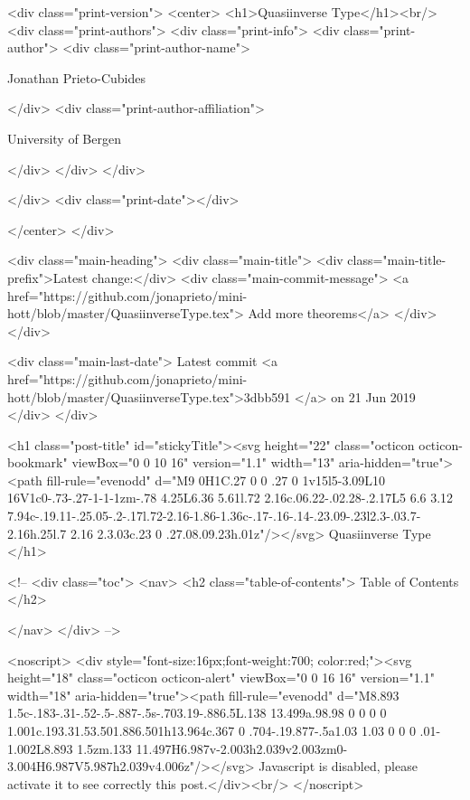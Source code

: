   <div class="print-version">
    <center>
      <h1>Quasiinverse Type</h1><br/>
        <div class="print-authors">
          <div class="print-info">
            <div class="print-author">
              <div class="print-author-name">
                
                  Jonathan Prieto-Cubides
                
              </div>
              <div class="print-author-affiliation">
                
                  University of Bergen
                
                </div>
            </div>
          </div>
          
          
        </div>
        <div class="print-date"></div>
        
        
    </center>
  </div>

  
  <div class="main-heading">
    <div class="main-title">
      <div class="main-title-prefix">Latest change:</div>
      <div class="main-commit-message">
            <a href="https://github.com/jonaprieto/mini-hott/blob/master/QuasiinverseType.tex">
              Add more theorems</a>
      </div>
    </div>

    <div class="main-last-date">
      Latest commit <a href="https://github.com/jonaprieto/mini-hott/blob/master/QuasiinverseType.tex">3dbb591 </a> on  21 Jun 2019
    </div>
  </div>
  
  <h1 class="post-title" id="stickyTitle"><svg height="22" class="octicon octicon-bookmark" viewBox="0 0 10 16" version="1.1" width="13" aria-hidden="true"><path fill-rule="evenodd" d="M9 0H1C.27 0 0 .27 0 1v15l5-3.09L10 16V1c0-.73-.27-1-1-1zm-.78 4.25L6.36 5.61l.72 2.16c.06.22-.02.28-.2.17L5 6.6 3.12 7.94c-.19.11-.25.05-.2-.17l.72-2.16-1.86-1.36c-.17-.16-.14-.23.09-.23l2.3-.03.7-2.16h.25l.7 2.16 2.3.03c.23 0 .27.08.09.23h.01z"/></svg> Quasiinverse Type
  </h1>

  <!-- 
  <div class="toc">
    <nav>
    <h2 class="table-of-contents"> Table of Contents </h2>
      

    </nav>
  </div>
   -->

  <noscript>
  <div style="font-size:16px;font-weight:700; color:red;"><svg height="18" class="octicon octicon-alert" viewBox="0 0 16 16" version="1.1" width="18" aria-hidden="true"><path fill-rule="evenodd" d="M8.893 1.5c-.183-.31-.52-.5-.887-.5s-.703.19-.886.5L.138 13.499a.98.98 0 0 0 0 1.001c.193.31.53.501.886.501h13.964c.367 0 .704-.19.877-.5a1.03 1.03 0 0 0 .01-1.002L8.893 1.5zm.133 11.497H6.987v-2.003h2.039v2.003zm0-3.004H6.987V5.987h2.039v4.006z"/></svg> Javascript is disabled, please activate it to see correctly this post.</div><br/>
  </noscript>

